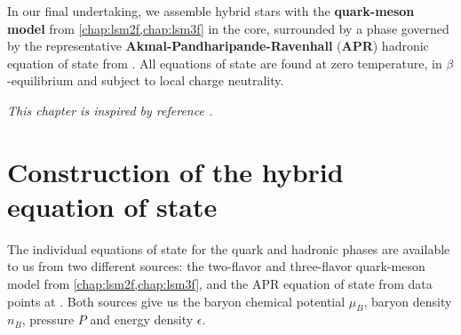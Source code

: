 In our final undertaking,
we assemble hybrid stars with the \textbf{quark-meson model} from \cref{chap:lsm2f,chap:lsm3f} in the core,
surrounded by a phase governed by the representative \textbf{Akmal-Pandharipande-Ravenhall} (\textbf{APR}) hadronic equation of state from \cite{ref:apr}.
All equations of state are found at zero temperature, in $\beta$-equilibrium and subject to local charge neutrality.

\textit{This chapter is inspired by reference \cite{ref:quark_star_review}.}

\section{Construction of the hybrid equation of state}
\label{sec:hybrid:construction}

The individual equations of state for the quark and hadronic phases are available to us from two different sources:
the two-flavor and three-flavor quark-meson model from \cref{chap:lsm2f,chap:lsm3f},
and the APR equation of state from data points at \cite{ref:apr_data}.
Both sources give us the baryon chemical potential $\mu_B$, baryon density $n_B$, pressure $P$ and energy density $\epsilon$.

